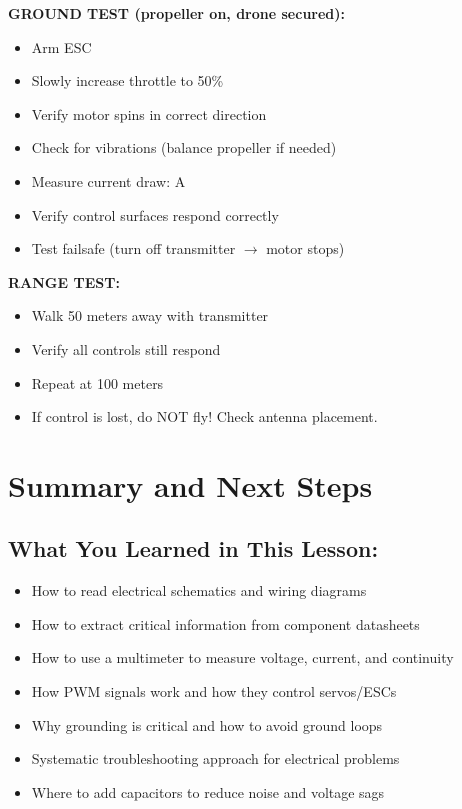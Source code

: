 \documentclass[11pt,letterpaper]{article}
\begin{document}
\textbf{GROUND TEST (propeller on, drone secured):}
\begin{itemize}[label=$\square$]
\item Arm ESC
\item Slowly increase throttle to 50\%
\item Verify motor spins in correct direction
\item Check for vibrations (balance propeller if needed)
\item Measure current draw: \underline{\hspace{2cm}} A
\item Verify control surfaces respond correctly
\item Test failsafe (turn off transmitter $\rightarrow$ motor stops)
\end{itemize}

\textbf{RANGE TEST:}
\begin{itemize}[label=$\square$]
\item Walk 50 meters away with transmitter
\item Verify all controls still respond
\item Repeat at 100 meters
\item If control is lost, do NOT fly! Check antenna placement.
\end{itemize}

\newpage
\section{Summary and Next Steps}

\subsection*{What You Learned in This Lesson:}

\begin{itemize}
\item How to read electrical schematics and wiring diagrams
\item How to extract critical information from component datasheets
\item How to use a multimeter to measure voltage, current, and continuity
\item How PWM signals work and how they control servos/ESCs
\item Why grounding is critical and how to avoid ground loops
\item Systematic troubleshooting approach for electrical problems
\item Where to add capacitors to reduce noise and voltage sags
\end{itemize}
\end{document}
